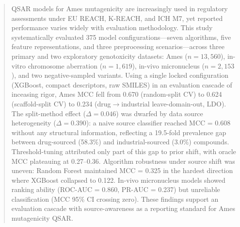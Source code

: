 \begin{abstract}
QSAR models for Ames mutagenicity are increasingly used in regulatory assessments under EU REACH, K-REACH, and ICH M7,\cite{EU_REACH_2006,K_REACH_2018,ICH_M7_2017} 
yet reported performance varies widely with evaluation methodology.\cite{Honma_2019,Furuhama_2023,Wu_MoleculeNet_2018} This study systematically evaluated 375 model configurations---seven algorithms, 
five feature representations, and three preprocessing scenarios---across three primary and two exploratory genotoxicity datasets: Ames ($n = 13{,}560$), in-vitro chromosome aberration ($n = 1{,}619$), in-vivo micronucleus ($n = 2{,}153$), 
and two negative-sampled variants. Using a single locked configuration (XGBoost, compact descriptors, raw SMILES) in an evaluation cascade of inceasing rigor,
Ames MCC fell from 0.670 (random-split CV) to 0.624 (scaffold-split CV) to 0.234 (drug$\to$industrial leave-domain-out, LDO). The split-method effect ($\Delta = 0.046$) was dwarfed 
by data source heterogeneity ($\Delta = 0.390$): a naive source classifier reached MCC = 0.608 without any structural information, reflecting a 19.5-fold prevalence gap 
between drug-sourced (58.3\%) and industrial-sourced (3.0\%) compounds. Threshold-tuning attributed only part of this gap to prior shift, with oracle MCC plateauing at 0.27--0.36. 
Algorithm robustness under source shift was uneven: Random Forest maintained MCC = 0.325 in the hardest direction where XGBoost collapsed to 0.122. 
In-vivo micronucleus models showed ranking ability (ROC-AUC = 0.860, PR-AUC = 0.237) but unreliable classification (MCC 95\% CI crossing zero). 
These findings support an evaluation cascade with source-awareness as a reporting standard for Ames mutagenicity QSAR.
\end{abstract}
